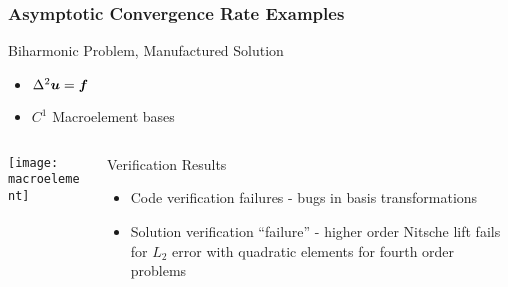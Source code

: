 \begin{frame}
\frametitle{Asymptotic Convergence Rate Examples}
\begin{block}{Biharmonic Problem, Manufactured Solution}
\begin{itemize}
\item $\Delta^2 {\boldsymbol{u}} = {\boldsymbol{f}}$
\item $C^1$ Macroelement bases
\end{itemize}
\end{block}

\begin{columns}
\begin{column}{.5\textwidth}
\texttt{[image: macroelement]}
\end{column}
\begin{column}{.5\textwidth}
\begin{block}{Verification Results}
\begin{itemize}
\item Code verification failures - bugs in basis transformations
\item Solution verification ``failure'' - higher order Nitsche lift
fails for $L_2$ error with quadratic elements for fourth order problems
\end{itemize}
\end{block}
\end{column}
\end{columns}

\end{frame}

